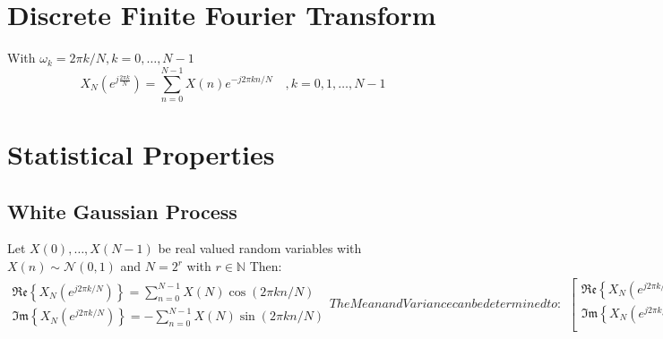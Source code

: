 \documentclass[accentcolor=tud4c,9.5pt,nochapname,bigchapter,paper=a5report]{tudreport}
\begin{document}
\section{Discrete Finite Fourier Transform}
With $\omega_k=2\pi k/N, k=0,\ldots,N-1$
\begin{equation}
X_N(e^{j\frac{2\pi k}{N}})=\sum\limits_{n=0}^{N-1}X(n)e^{-j2\pi kn/N} \quad,k=0,1,\ldots,N-1
\end{equation}

\section{Statistical Properties}
\subsection{White Gaussian Process}
Let $X(0),\ldots,X(N-1)$ be real valued random variables with $X(n)\sim\mathcal{N}(0,1)$ and $N=2^r$ with $r \in \mathbb{N}$
Then:
\begin{subequations}
\begin{align}
\mathfrak{Re}\left\{X_N(e^{j2\pi k/N})\right\} = \sum\limits_{n=0}^{N-1} X(N)\cos(2\pi kn/N)\\
\mathfrak{Im}\left\{X_N(e^{j2\pi k/N})\right\} = -\sum\limits_{n=0}^{N-1} X(N)\sin(2\pi kn/N)
\end{align}
The Mean and Variance can be determined to:
\begin{align}
\begin{bmatrix}
\mathfrak{Re}\left\{X_N(e^{j2\pi k/N})\right\}\\
\mathfrak{Im}\left\{X_N(e^{j2\pi k/N})\right\}\\
\end{bmatrix} \sim \mathcal{N}\left( \begin{bmatrix}0\\0\end{bmatrix}, \frac{N}{2}
\begin{bmatrix}1&0\\0&1\end{bmatrix}\right)
\end{align}
\end{subequations}
\end{document}
